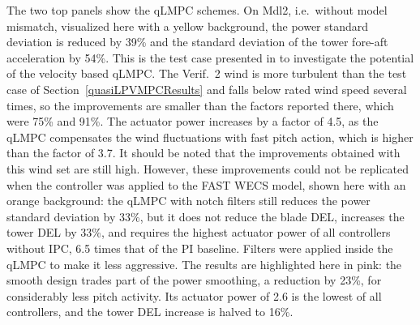 The two top panels show the qLMPC schemes. On Mdl2, i.e.\ without model mismatch, visualized here with a yellow background, the power
standard deviation is reduced by 39\% and the standard deviation of the tower fore-aft acceleration by
54\%. This is the test case presented in \cite{dittmer2021velocity} to investigate the potential of the velocity based qLMPC. The Verif.~2 wind is more turbulent than the test case of Section~\ref{quasiLPVMPCResults} and
falls below rated wind speed several times, so the improvements are smaller than the factors
reported there, which were 75\% and 91\%. The actuator power increases by a factor of 4.5, as the qLMPC compensates the
wind fluctuations with fast pitch action, which is higher than the factor of 3.7. It should be noted that the improvements obtained with this wind set are still high. However, these improvements could not be replicated when the controller was applied to the FAST WECS model, shown here with an orange background: the qLMPC with notch filters still reduces the
power standard deviation by 33\%, but it does not reduce the blade DEL, increases the tower DEL
by 33\%, and requires the highest actuator power of all controllers without IPC, 6.5 times that
of the PI baseline. Filters were applied inside the qLMPC to make it less aggressive. The results are highlighted here in pink: the smooth design trades part of the power smoothing, a reduction by 23\%,
for considerably less pitch activity. Its actuator power of 2.6 is the lowest of all controllers,
and the tower DEL increase is halved to 16\%.

